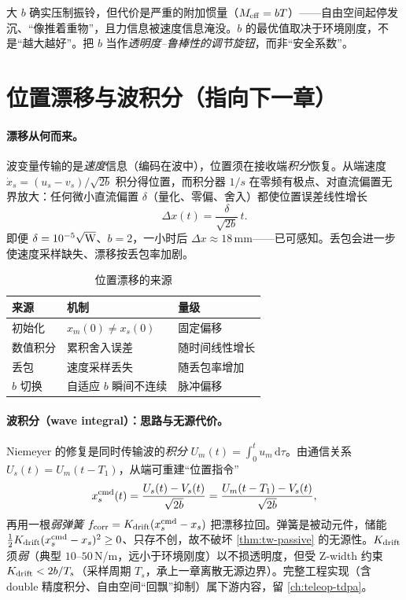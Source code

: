 \begin{pitfall}[“$b$ 越大越稳所以越好”]
大 $b$ 确实压制振铃，但代价是严重的附加惯量（$M_{\rm eff}=bT$）——自由空间起停发沉、“像推着重物”，且力信息被速度信息淹没。$b$ 的最优值取决于环境刚度，不是“越大越好”。把 $b$ 当作\emph{透明度--鲁棒性的调节旋钮}，而非“安全系数”。
\end{pitfall}

\section{位置漂移与波积分（指向下一章）}
\label{sec:tw-drift}

\paragraph{漂移从何而来。}
波变量传输的是\emph{速度}信息（编码在波中），位置须在接收端\emph{积分}恢复。从端速度 $\dot x_s=(u_s-v_s)/\sqrt{2b}$ 积分得位置，而积分器 $1/s$ 在零频有极点、对直流偏置无界放大：任何微小直流偏置 $\delta$（量化、零偏、舍入）都使位置误差线性增长
\begin{equation}
  \Delta x(t)=\frac{\delta}{\sqrt{2b}}\,t.
  \label{eq:tw-drift}
\end{equation}
即便 $\delta=10^{-5}\sqrt{\text W}$、$b=2$，一小时后 $\Delta x\approx18\,$mm——已可感知。丢包会进一步使速度采样缺失、漂移按丢包率加剧。

\begin{table}[H]\centering\small
\caption{位置漂移的来源}
\label{tab:tw-drift-sources}
\begin{tabular}{lll}
\toprule
来源 & 机制 & 量级 \\
\midrule
初始化 & $x_m(0)\neq x_s(0)$ & 固定偏移 \\
数值积分 & 累积舍入误差 & 随时间线性增长 \\
丢包 & 速度采样丢失 & 随丢包率增加 \\
$b$ 切换 & 自适应 $b$ 瞬间不连续 & 脉冲偏移 \\
\bottomrule
\end{tabular}
\end{table}

\paragraph{波积分（wave integral）：思路与无源代价。}
Niemeyer 的修复是同时传输波的\emph{积分} $U_m(t)=\int_0^t u_m\,\mathrm d\tau$。由通信关系 $U_s(t)=U_m(t-T_1)$，从端可重建“位置指令”
\begin{equation}
  x_s^{\rm cmd}(t)=\frac{U_s(t)-V_s(t)}{\sqrt{2b}}=\frac{U_m(t-T_1)-V_s(t)}{\sqrt{2b}},
  \label{eq:tw-xcmd}
\end{equation}
再用一根\emph{弱弹簧} $f_{\rm corr}=K_{\rm drift}(x_s^{\rm cmd}-x_s)$ 把漂移拉回。弹簧是被动元件，储能 $\tfrac12K_{\rm drift}(x_s^{\rm cmd}-x_s)^2\ge0$、只存不创，故不破坏 \cref{thm:tw-passive} 的无源性。$K_{\rm drift}$ 须\emph{弱}（典型 $10$--$50\,$N/m，远小于环境刚度）以不损透明度，但受 Z-width 约束 $K_{\rm drift}<2b/T_s$（采样周期 $T_s$，承上一章离散无源边界）。完整工程实现（含 double 精度积分、自由空间“回飘”抑制）属下游内容，留 \cref{ch:teleop-tdpa}。

